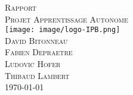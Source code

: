 \documentclass[a4paper, 11pt]{article}
\begin{document}
\begin{titlepage}
\begin{center}
\textsc{\huge Rapport}\\[3cm]
\textsc{\Huge Projet Apprentissage Autonome}\\[3cm]
\texttt{[image: image/logo-IPB.png]}\\[3cm]
\textsc{\Large David Bitonneau}\\
\textsc{\Large Fabien Depraetre}\\
\textsc{\Large Ludovic Hofer}\\
\textsc{\Large Thibaud Lambert}\\[3cm]
\textsc{\Large \today}\\
\end{center}
\end{titlepage}

\clearpage
\tableofcontents
\clearpage





\end{document}
